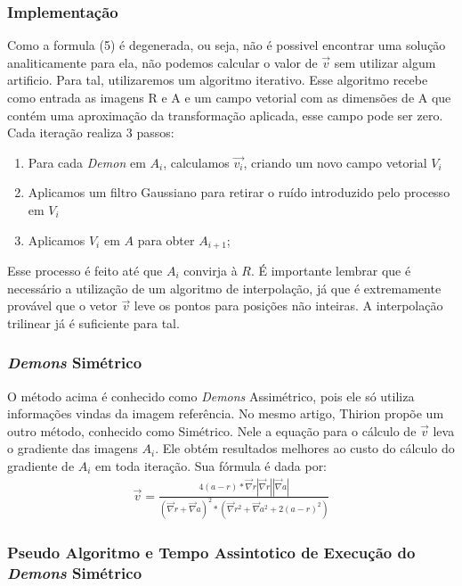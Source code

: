 \subsubsection{Implementação}
    Como a formula (5) é degenerada, ou seja, não é possivel encontrar uma solução analiticamente para ela,
não podemos calcular o valor de $\vec{v}$ sem utilizar algum artificio. Para tal,
utilizaremos um algoritmo iterativo. Esse algoritmo recebe como entrada as imagens R e A e um campo vetorial
com as dimensões de A que contém uma aproximação da transformação aplicada, esse campo pode ser zero. 
Cada iteração realiza 3 passos:
\begin{enumerate}
    \item Para cada \textit{Demon} em $A_i$, calculamos $\vec{v_i}$, criando um novo campo vetorial $V_i$
    \item Aplicamos um filtro Gaussiano para retirar o ruído introduzido pelo processo em $V_i$
    \item Aplicamos $V_i$ em $A$ para obter $A_{i+1}$;
\end{enumerate}
    Esse processo é feito até que $A_i$ convirja à $R$. É importante lembrar que é necessário a
utilização de um algoritmo de interpolação, já que é extremamente provável que o vetor $\vec{v}$
leve os pontos para posições não inteiras. A interpolação trilinear já é suficiente para tal.

\subsubsection{\textit{Demons} Simétrico}
    O método acima é conhecido como \textit{Demons} Assimétrico, pois ele só utiliza informações vindas
da imagem referência. No mesmo artigo, Thirion propõe um outro método, conhecido como Simétrico.
Nele a equação para o cálculo de $\vec{v}$ leva o gradiente das imagens $A_i$. Ele obtém resultados
melhores ao custo do cálculo do gradiente de $A_i$ em toda iteração. Sua fórmula é dada por:
\begin{align}\label{math:demons}
    \vec{v} = \frac{4(a - r)*\vec{\nabla}r|\vec{\nabla}r||\vec{\nabla}a|}
                    {(\vec{\nabla}r+\vec{\nabla}a)^2*(\vec{\nabla}r^2 + \vec{\nabla}a^2 + 2(a - r)^2)}
\end{align}

\subsubsection{Pseudo Algoritmo e Tempo Assintotico de Execução do \textit{Demons} Simétrico}

